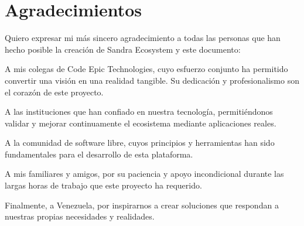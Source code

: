 \chapter*{Agradecimientos}

Quiero expresar mi más sincero agradecimiento a todas las personas que han hecho posible la creación de Sandra Ecosystem y este documento:

A mis colegas de Code Epic Technologies, cuyo esfuerzo conjunto ha permitido convertir una visión en una realidad tangible. Su dedicación y profesionalismo son el corazón de este proyecto.

A las instituciones que han confiado en nuestra tecnología, permitiéndonos validar y mejorar continuamente el ecosistema mediante aplicaciones reales.

A la comunidad de software libre, cuyos principios y herramientas han sido fundamentales para el desarrollo de esta plataforma.

A mis familiares y amigos, por su paciencia y apoyo incondicional durante las largas horas de trabajo que este proyecto ha requerido.

Finalmente, a Venezuela, por inspirarnos a crear soluciones que respondan a nuestras propias necesidades y realidades.

\newpage
